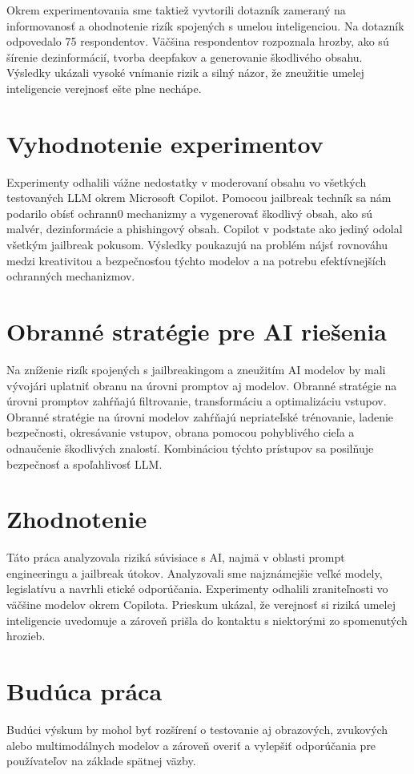 Okrem experimentovania sme taktiež vyvtorili dotazník zameraný na informovanosť a ohodnotenie rizík spojených s umelou inteligenciou. Na dotazník odpovedalo 75 respondentov. Väčšina respondentov rozpoznala hrozby, ako sú šírenie dezinformácií, tvorba deepfakov a generovanie škodlivého obsahu. Výsledky ukázali vysoké vnímanie rizik a silný názor, že zneužitie umelej inteligencie verejnosť ešte plne nechápe.

\section*{Vyhodnotenie experimentov \label{sec:experiments_eval_resume}}

Experimenty odhalili vážne nedostatky v moderovaní obsahu vo všetkých testovaných LLM okrem Microsoft Copilot. Pomocou jailbreak techník sa nám podarilo obísť ochrann0 mechanizmy a vygenerovať škodlivý obsah, ako sú malvér, dezinformácie a phishingový obsah. Copilot v podstate ako jediný odolal všetkým jailbreak pokusom. Výsledky poukazujú na problém nájsť rovnováhu medzi kreativitou a bezpečnosťou týchto modelov a na potrebu efektívnejších ochranných mechanizmov.

\section*{Obranné stratégie pre AI riešenia \label{sec:mitigation_strategies_resume}}

Na zníženie rizík spojených s jailbreakingom a zneužitím AI modelov by mali vývojári uplatniť obranu na úrovni promptov aj modelov. Obranné stratégie na úrovni promptov zahŕňajú filtrovanie, transformáciu a optimalizáciu vstupov. Obranné stratégie na úrovni modelov zahŕňajú nepriateľské trénovanie, ladenie bezpečnosti, okresávanie vstupov, obrana pomocou pohyblivého cieľa a odnaučenie škodlivých znalostí. Kombináciou týchto prístupov sa posilňuje bezpečnosť a spoľahlivosť LLM.

\section*{Zhodnotenie \label{sec:conclusion_summary_resume}}

Táto práca analyzovala riziká súvisiace s AI, najmä v oblasti prompt engineeringu a jailbreak útokov. Analyzovali sme najznámejšie veľké modely, legislatívu a navrhli etické odporúčania. Experimenty odhalili zraniteľnosti vo väčšine modelov okrem Copilota. Prieskum ukázal, že verejnosť si riziká umelej inteligencie uvedomuje a zároveň prišla do kontaktu s niektorými zo spomenutých hrozieb.

\section*{Budúca práca \label{sec:future_work_resume}}

Budúci výskum by mohol byť rozšírení o testovanie aj obrazových, zvukových alebo multimodálnych modelov a zároveň overiť a vylepšiť odporúčania pre používateľov na základe spätnej väzby.